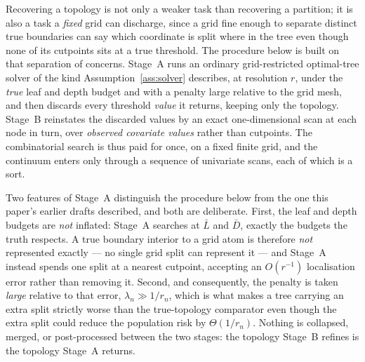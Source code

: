 \documentclass[11pt]{article}
\theoremstyle{plain}
\theoremstyle{definition}
\theoremstyle{remark}
\begin{document}
Recovering a topology is not only a weaker task than recovering a partition;
it is also a task a \emph{fixed} grid can discharge, since a grid fine enough
to separate distinct true boundaries can say which coordinate is split where
in the tree even though none of its cutpoints sits at a true threshold. The
procedure below is built on that separation of concerns. Stage~A runs an
ordinary grid-restricted optimal-tree solver of the kind
Assumption~\ref{ass:solver} describes, at resolution $r$, under the
\emph{true} leaf and depth budget and with a penalty large relative to the
grid mesh, and then discards every threshold \emph{value} it returns, keeping
only the topology. Stage~B
reinstates the discarded values by an exact one-dimensional scan at each node
in turn, over \emph{observed covariate values} rather than cutpoints. The
combinatorial search is thus paid for once, on a fixed finite grid, and the
continuum enters only through a sequence of univariate scans, each of which is
a sort.

Two features of Stage~A distinguish the procedure below from the one this
paper's earlier drafts described, and both are deliberate. First, the leaf and
depth budgets are \emph{not} inflated: Stage~A searches at $\bar L$ and
$\bar D$, exactly the budgets the truth respects. A true boundary interior to
a grid atom is therefore \emph{not} represented exactly --- no single grid
split can represent it --- and Stage~A instead spends one split at a nearest
cutpoint, accepting an $O(r^{-1})$ localisation error rather than removing it.
Second, and consequently, the penalty is taken \emph{large} relative to that
error, $\lambda_n\gg1/r_n$, which is what makes a tree carrying an extra
split strictly worse than the true-topology comparator even though the extra
split could reduce the population risk by $\Theta(1/r_n)$. Nothing is
collapsed, merged, or post-processed between the two stages: the topology
Stage~B refines is the topology Stage~A returns.
\end{document}
